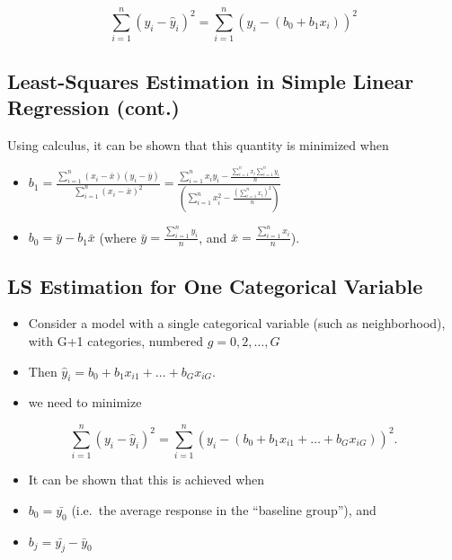 \documentclass[]{book}
\providecommand{\tightlist}{%
  \setlength{\itemsep}{0pt}\setlength{\parskip}{0pt}}
\begin{document}
\[
\displaystyle\sum_{i=1}^n(y_i-\hat{y}_i)^2 =\displaystyle\sum_{i=1}^n(y_i-(b_0+b_1x_i))^2
\]

\subsection{Least-Squares Estimation in Simple Linear Regression
(cont.)}\label{least-squares-estimation-in-simple-linear-regression-cont.}

Using calculus, it can be shown that this quantity is minimized when

\begin{itemize}
\item
  \(b_1=\frac{\displaystyle\sum_{i=1}^{n}(x_i-\bar{x})(y_i-\bar{y})}{\displaystyle\sum_{i=1}^{n}(x_i-\bar{x})^2}=\frac{\displaystyle\sum_{i=1}^{n} x_i y_i-\frac{\displaystyle\sum_{i=1}^{n} x_i \displaystyle\sum_{i=1}^{n} y_i }{n}}{\left(\displaystyle\sum_{i=1}^{n} x_i^2 -\frac{\left(\displaystyle\sum_{i=1}^{n} x_i\right)^2}{n}\right)}\)
\item
  \(b_0=\bar{y}-b_1\bar{x}\) (where
  \(\bar{y}=\frac{\displaystyle\sum_{i=1}^{n}{y_i}}{n}\), and
  \(\bar{x}=\frac{\displaystyle\sum_{i=1}^{n}{x_i}}{n}\)).
\end{itemize}

\subsection{LS Estimation for One Categorical
Variable}\label{ls-estimation-for-one-categorical-variable}

\begin{itemize}
\item
  Consider a model with a single categorical variable (such as
  neighborhood), with G+1 categories, numbered \(g=0,2, \ldots, G\)
\item
  Then \(\hat{y}_i = b_0 + b_1x_{i1} + \ldots +b_{G}x_{iG}\).
\item
  we need to minimize
\end{itemize}

\[
\displaystyle\sum_{i=1}^n(y_i-\hat{y}_i)^2 =\displaystyle\sum_{i=1}^n(y_i-(b_0 + b_1x_{i1} + \ldots +b_{G}x_{iG}))^2.   
\]

\begin{itemize}
\tightlist
\item
  It can be shown that this is achieved when\\
\item
  \(b_0 = \bar{y_0}\) (i.e.~the average response in the ``baseline
  group''), and\\
\item
  \(b_j = \bar{y_j} - \bar{y}_0\)
\end{itemize}
\end{document}
